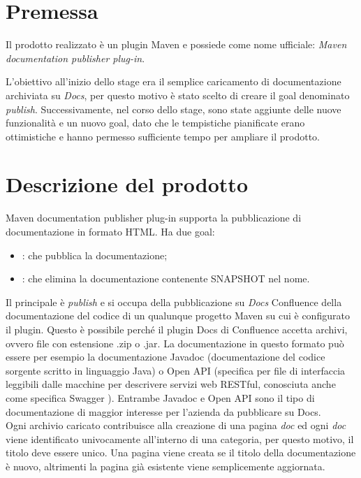 \section{Premessa}
Il prodotto realizzato è un plugin Maven e possiede come nome ufficiale: \emph{Maven documentation publisher plug-in}.

L'obiettivo all'inizio dello stage era il semplice caricamento di documentazione archiviata su \emph{Docs}, per questo motivo è stato scelto di creare il goal denominato \emph{publish}.
Successivamente, nel corso dello stage, sono state aggiunte delle nuove funzionalità e un nuovo goal, dato che le tempistiche pianificate erano ottimistiche e hanno permesso sufficiente tempo per ampliare il prodotto.


\section{Descrizione del prodotto} \label{descrizioneProdotto}

Maven documentation publisher plug-in supporta la pubblicazione di documentazione in formato HTML. Ha due goal:
\begin{itemize}
	\item {}: che pubblica la documentazione;
	\item {}: che elimina la documentazione contenente SNAPSHOT nel nome.
\end{itemize}
Il principale è \emph{publish} e si occupa della pubblicazione su  \emph{Docs} Confluence della documentazione del codice di un qualunque progetto Maven su cui è configurato il plugin.
Questo è possibile perché il plugin Docs di Confluence accetta archivi, ovvero file con estensione .zip o .jar.
La documentazione in questo formato può essere per esempio la documentazione Javadoc (documentazione del codice sorgente scritto in linguaggio Java) o Open API (specifica per file di interfaccia leggibili dalle macchine per descrivere servizi web RESTful, conosciuta anche come specifica Swagger \cite{site:specifica-openapi}).
Entrambe Javadoc e Open API sono il tipo di documentazione di maggior interesse per l'azienda da pubblicare su Docs. \\
Ogni archivio caricato contribuisce alla creazione di una pagina \emph{doc} ed ogni \emph{doc} viene identificato univocamente all'interno di una categoria, per questo motivo, il titolo deve essere unico.
Una pagina viene creata se il titolo della documentazione è nuovo, altrimenti la pagina già esistente viene semplicemente aggiornata. \\ 
 
